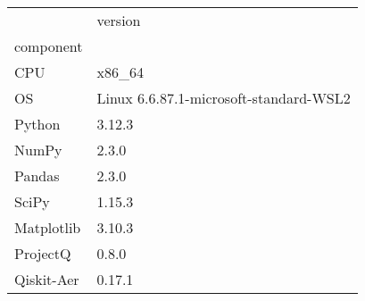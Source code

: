 \begin{tabular}{ll}
\toprule
 & version \\
component &  \\
\midrule
CPU & x86_64 \\
OS & Linux 6.6.87.1-microsoft-standard-WSL2 \\
Python & 3.12.3 \\
NumPy & 2.3.0 \\
Pandas & 2.3.0 \\
SciPy & 1.15.3 \\
Matplotlib & 3.10.3 \\
ProjectQ & 0.8.0 \\
Qiskit-Aer & 0.17.1 \\
\bottomrule
\end{tabular}
